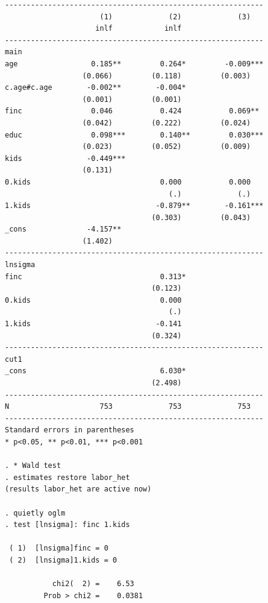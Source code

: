 \begin{verbatim}
------------------------------------------------------------
                      (1)             (2)             (3)   
                     inlf            inlf                   
------------------------------------------------------------
main                                                        
age                 0.185**         0.264*         -0.009***
                  (0.066)         (0.118)         (0.003)   
c.age#c.age        -0.002**        -0.004*                  
                  (0.001)         (0.001)                   
finc                0.046           0.424           0.069** 
                  (0.042)         (0.222)         (0.024)   
educ                0.098***        0.140**         0.030***
                  (0.023)         (0.052)         (0.009)   
kids               -0.449***                                
                  (0.131)                                   
0.kids                              0.000           0.000   
                                      (.)             (.)   
1.kids                             -0.879**        -0.161***
                                  (0.303)         (0.043)   
_cons              -4.157**                                 
                  (1.402)                                   
------------------------------------------------------------
lnsigma                                                     
finc                                0.313*                  
                                  (0.123)                   
0.kids                              0.000                   
                                      (.)                   
1.kids                             -0.141                   
                                  (0.324)                   
------------------------------------------------------------
cut1                                                        
_cons                               6.030*                  
                                  (2.498)                   
------------------------------------------------------------
N                     753             753             753   
------------------------------------------------------------
Standard errors in parentheses
* p<0.05, ** p<0.01, *** p<0.001

. * Wald test
. estimates restore labor_het
(results labor_het are active now)

. quietly oglm
. test [lnsigma]: finc 1.kids

 ( 1)  [lnsigma]finc = 0
 ( 2)  [lnsigma]1.kids = 0

           chi2(  2) =    6.53
         Prob > chi2 =    0.0381
\end{verbatim}

